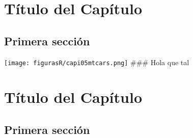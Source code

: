 \documentclass[12pt,a4paper,]{book}
\def\ifdoblecara{} %
\def\ifprincipal{} %
\numberwithin{dummy}{section}
\theoremstyle{ocrenumbox}
\theoremstyle{blacknumex}
\theoremstyle{blacknumbox}
\theoremstyle{ocrenum}
\theoremstyle{ocrenum}
\begin{document}
\renewcommand{\headrulewidth}{0.4pt}
\renewcommand{\footrulewidth}{0.4pt}

\ifdefined\ifprincipal
\else
\setlength{\parindent}{1em}
\pagestyle{fancy}
\setcounter{tocdepth}{4}
\tableofcontents

\fi

\ifdefined\ifdoblecara
\fancyhead{}{}
\fancyhead[LE,RO]{\scriptsize\rightmark}
\fancyfoot[LO,RE]{\scriptsize\slshape \leftmark}
\fancyfoot[C]{}
\fancyfoot[LE,RO]{\footnotesize\thepage}
\else
\fancyhead{}{}
\fancyhead[RO]{\scriptsize\rightmark}
\fancyfoot[LO]{\scriptsize\slshape \leftmark}
\fancyfoot[C]{}
\fancyfoot[RO]{\footnotesize\thepage}
\fi
\renewcommand{\headrulewidth}{0.4pt}
\renewcommand{\footrulewidth}{0.4pt}

\hypertarget{tuxedtulo-del-capuxedtulo}{%
\chapter{Título del Capítulo}\label{tuxedtulo-del-capuxedtulo}}

\hypertarget{primera-secciuxf3n}{%
\section{Primera sección}\label{primera-secciuxf3n}}

\texttt{[image: figurasR/capi05mtcars.png]} \#\#\# Hola que tal

\FloatBarrier

\ifdefined\ifprincipal
\else
\setlength{\parindent}{1em}
\pagestyle{fancy}
\setcounter{tocdepth}{4}
\tableofcontents

\fi

\ifdefined\ifdoblecara
\fancyhead{}{}
\fancyhead[LE,RO]{\scriptsize\rightmark}
\fancyfoot[LO,RE]{\scriptsize\slshape \leftmark}
\fancyfoot[C]{}
\fancyfoot[LE,RO]{\footnotesize\thepage}
\else
\fancyhead{}{}
\fancyhead[RO]{\scriptsize\rightmark}
\fancyfoot[LO]{\scriptsize\slshape \leftmark}
\fancyfoot[C]{}
\fancyfoot[RO]{\footnotesize\thepage}
\fi
\renewcommand{\headrulewidth}{0.4pt}
\renewcommand{\footrulewidth}{0.4pt}

\hypertarget{tuxedtulo-del-capuxedtulo-1}{%
\chapter{Título del Capítulo}\label{tuxedtulo-del-capuxedtulo-1}}

\hypertarget{primera-secciuxf3n-1}{%
\section{Primera sección}\label{primera-secciuxf3n-1}}
\end{document}
